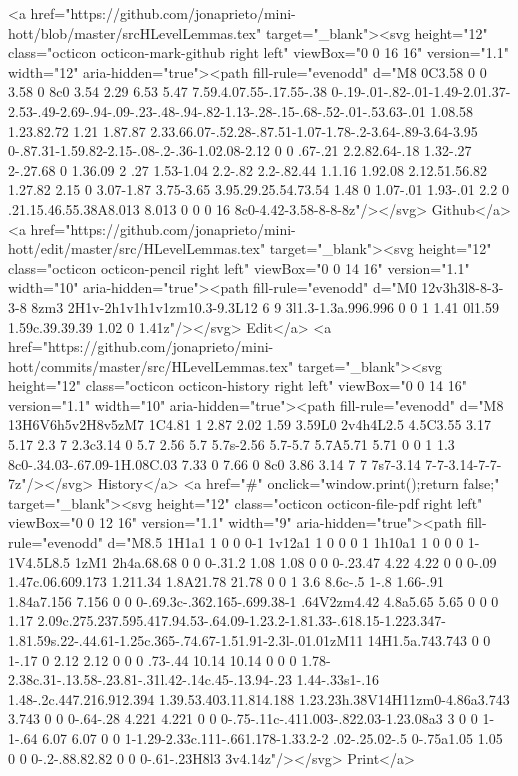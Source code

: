       <a href="https://github.com/jonaprieto/mini-hott/blob/master/srcHLevelLemmas.tex" target="_blank"><svg height="12" class="octicon octicon-mark-github right left" viewBox="0 0 16 16" version="1.1" width="12" aria-hidden="true"><path fill-rule="evenodd" d="M8 0C3.58 0 0 3.58 0 8c0 3.54 2.29 6.53 5.47 7.59.4.07.55-.17.55-.38 0-.19-.01-.82-.01-1.49-2.01.37-2.53-.49-2.69-.94-.09-.23-.48-.94-.82-1.13-.28-.15-.68-.52-.01-.53.63-.01 1.08.58 1.23.82.72 1.21 1.87.87 2.33.66.07-.52.28-.87.51-1.07-1.78-.2-3.64-.89-3.64-3.95 0-.87.31-1.59.82-2.15-.08-.2-.36-1.02.08-2.12 0 0 .67-.21 2.2.82.64-.18 1.32-.27 2-.27.68 0 1.36.09 2 .27 1.53-1.04 2.2-.82 2.2-.82.44 1.1.16 1.92.08 2.12.51.56.82 1.27.82 2.15 0 3.07-1.87 3.75-3.65 3.95.29.25.54.73.54 1.48 0 1.07-.01 1.93-.01 2.2 0 .21.15.46.55.38A8.013 8.013 0 0 0 16 8c0-4.42-3.58-8-8-8z"/></svg> Github</a>
      <a href="https://github.com/jonaprieto/mini-hott/edit/master/src/HLevelLemmas.tex" target="_blank"><svg height="12" class="octicon octicon-pencil right left" viewBox="0 0 14 16" version="1.1" width="10" aria-hidden="true"><path fill-rule="evenodd" d="M0 12v3h3l8-8-3-3-8 8zm3 2H1v-2h1v1h1v1zm10.3-9.3L12 6 9 3l1.3-1.3a.996.996 0 0 1 1.41 0l1.59 1.59c.39.39.39 1.02 0 1.41z"/></svg> Edit</a>
      <a href="https://github.com/jonaprieto/mini-hott/commits/master/src/HLevelLemmas.tex" target="_blank"><svg height="12" class="octicon octicon-history right left" viewBox="0 0 14 16" version="1.1" width="10" aria-hidden="true"><path fill-rule="evenodd" d="M8 13H6V6h5v2H8v5zM7 1C4.81 1 2.87 2.02 1.59 3.59L0 2v4h4L2.5 4.5C3.55 3.17 5.17 2.3 7 2.3c3.14 0 5.7 2.56 5.7 5.7s-2.56 5.7-5.7 5.7A5.71 5.71 0 0 1 1.3 8c0-.34.03-.67.09-1H.08C.03 7.33 0 7.66 0 8c0 3.86 3.14 7 7 7s7-3.14 7-7-3.14-7-7-7z"/></svg> History</a>
      <a  href="#" onclick="window.print();return false;" target="_blank"><svg height="12" class="octicon octicon-file-pdf right left" viewBox="0 0 12 16" version="1.1" width="9" aria-hidden="true"><path fill-rule="evenodd" d="M8.5 1H1a1 1 0 0 0-1 1v12a1 1 0 0 0 1 1h10a1 1 0 0 0 1-1V4.5L8.5 1zM1 2h4a.68.68 0 0 0-.31.2 1.08 1.08 0 0 0-.23.47 4.22 4.22 0 0 0-.09 1.47c.06.609.173 1.211.34 1.8A21.78 21.78 0 0 1 3.6 8.6c-.5 1-.8 1.66-.91 1.84a7.156 7.156 0 0 0-.69.3c-.362.165-.699.38-1 .64V2zm4.42 4.8a5.65 5.65 0 0 0 1.17 2.09c.275.237.595.417.94.53-.64.09-1.23.2-1.81.33-.618.15-1.223.347-1.81.59s.22-.44.61-1.25c.365-.74.67-1.51.91-2.3l-.01.01zM11 14H1.5a.743.743 0 0 1-.17 0 2.12 2.12 0 0 0 .73-.44 10.14 10.14 0 0 0 1.78-2.38c.31-.13.58-.23.81-.31l.42-.14c.45-.13.94-.23 1.44-.33s1-.16 1.48-.2c.447.216.912.394 1.39.53.403.11.814.188 1.23.23h.38V14H11zm0-4.86a3.743 3.743 0 0 0-.64-.28 4.221 4.221 0 0 0-.75-.11c-.411.003-.822.03-1.23.08a3 3 0 0 1-1-.64 6.07 6.07 0 0 1-1.29-2.33c.111-.661.178-1.33.2-2 .02-.25.02-.5 0-.75a1.05 1.05 0 0 0-.2-.88.82.82 0 0 0-.61-.23H8l3 3v4.14z"/></svg> Print</a>
